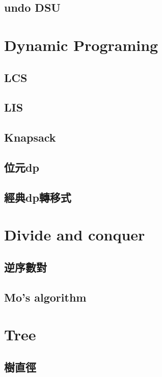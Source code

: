 \subsection{undo DSU}


\section{Dynamic Programing}
\subsection{LCS}

\subsection{LIS}

\subsection{Knapsack}

\subsection{位元dp}

\subsection{經典dp轉移式}


\section{Divide and conquer}
\subsection{逆序數對}

\subsection{Mo's algorithm}


\section{Tree}
\subsection{樹直徑}

